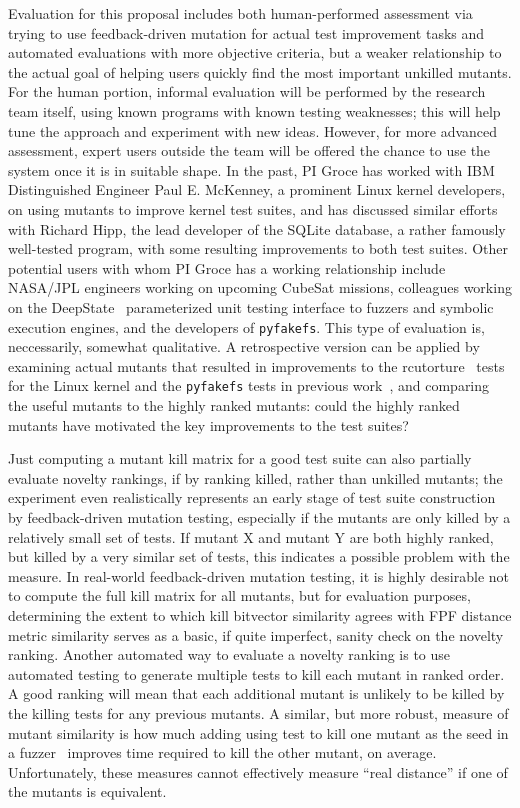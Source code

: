 Evaluation for this proposal includes both human-performed assessment
via trying to use feedback-driven mutation for actual test improvement
tasks and automated evaluations with more objective criteria, but a
weaker relationship to the actual goal of helping users quickly find
the most important unkilled mutants.  For the human portion, informal
evaluation will be performed by the research team itself, using known
programs with known testing weaknesses; this will help tune the
approach and experiment with new ideas.  However, for more advanced
assessment, expert users outside the team will be offered the chance
to use the system once it is in suitable shape.  In the past, PI Groce
has worked with IBM Distinguished Engineer Paul E. McKenney, a
prominent Linux kernel developers, on using mutants to improve kernel
test suites, and has discussed similar efforts with Richard Hipp, the
lead developer of the SQLite database, a rather famously well-tested
program, with some resulting improvements to both test suites.  Other
potential users with whom PI Groce has a working relationship include NASA/JPL engineers working on upcoming CubeSat
missions, colleagues working on the DeepState~\cite{DeepState}
parameterized unit testing interface to fuzzers and symbolic execution
engines, and the developers of {\tt pyfakefs}.  This type of
evaluation is, neccessarily, somewhat qualitative.  A retrospective
version can be applied by examining actual mutants that resulted in
improvements to the rcutorture~\cite{rcutorture} tests for the Linux
kernel and the {\tt pyfakefs} tests in previous
work~\cite{groce2018verified}, and comparing the useful mutants to the
highly ranked mutants:  could the highly ranked mutants have motivated
the key improvements to the test suites?

Just computing a mutant kill matrix for a good test suite can also
partially evaluate novelty rankings, if by ranking
killed, rather than unkilled mutants; the experiment even
realistically represents an early stage of test suite construction by
feedback-driven mutation testing, especially if the mutants are only
killed by a relatively small set of tests.  If
mutant X and mutant Y are both highly ranked, but killed by a very
similar set of tests, this indicates a possible problem with the
measure.  In real-world feedback-driven mutation testing, it is highly
desirable not to compute the full kill matrix for all mutants, but
for evaluation purposes, determining the extent to which kill
bitvector similarity agrees with FPF distance metric similarity serves
as a basic, if quite imperfect, sanity check on the novelty ranking.
Another automated way to evaluate a novelty ranking is to use automated
testing to generate multiple tests to kill each mutant in ranked order.  A good ranking will mean
that each additional mutant is unlikely to be killed by the killing
tests for any previous mutants.  A similar, but more robust, measure of mutant similarity
is how much adding using test to kill one mutant as the seed in a
fuzzer~\cite{aflfuzz,libfuzzer} improves time required to kill the other
mutant, on average.  Unfortunately, these measures cannot effectively
measure ``real distance'' if one of the mutants is equivalent.

